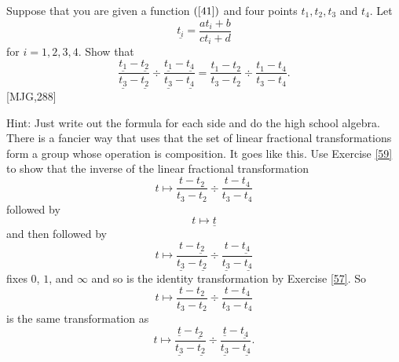 \begin{exercise}
\label{42}Suppose that you are given a function $\left(  \ref{41}\right)  $
and four points $t_{1},t_{2},t_{3}$ and $t_{4}$. Let
\[
\underline{t_{i}}=\frac{at_{i}+b}{ct_{i}+d}%
\]
for $i=1,2,3,4$. Show that%
\[
\frac{\underline{t_{1}}-\underline{t_{2}}}{\underline{t_{3}}-\underline{t_{2}%
}}\div\frac{\underline{t_{1}}-\underline{t_{4}}}{\underline{t_{3}}%
-\underline{t_{4}}}=\frac{t_{1}-t_{2}}{t_{3}-t_{2}}\div\frac{t_{1}-t_{4}%
}{t_{3}-t_{4}}.
\]
[MJG,288]

Hint: Just write out the formula for each side and do the high school
algebra.  There is a fancier way that uses that the set of linear
fractional transformations form a group whose operation is
composition. It goes like this. Use Exercise \ref{59} to show that the
inverse of the linear fractional transformation
\[
t\mapsto\frac{t-t_{2}}{t_{3}-t_{2}}\div\frac{t-t_{4}}{t_{3}-t_{4}}%
\]
followed by%
\[
t\mapsto\underline{t}%
\]
and then followed by
\[
t\mapsto\frac{t-\underline{t_{2}}}{\underline{t_{3}}-\underline{t_{2}}}%
\div\frac{t-\underline{t_{4}}}{\underline{t_{3}}-\underline{t_{4}}}%
\]
fixes $0$, $1$, and $\infty$ and so is the identity transformation by Exercise
\ref{57}. So%
\[
t\mapsto\frac{t-t_{2}}{t_{3}-t_{2}}\div\frac{t-t_{4}}{t_{3}-t_{4}}%
\]
is the same transformation as%
\[
t\mapsto\frac{\underline{t}-\underline{t_{2}}}{\underline{t_{3}}%
-\underline{t_{2}}}\div\frac{\underline{t}-\underline{t_{4}}}{\underline
{t_{3}}-\underline{t_{4}}}.
\]
\begin{solution}
\end{solution}
\end{exercise}

